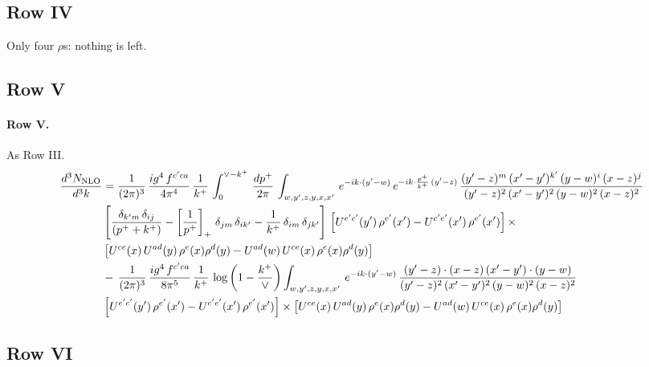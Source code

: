 \documentclass[10pt]{article}
\numberwithin{equation}{section}
\begin{document}
\subsection{Row IV}
Only four $\rho$\textquotesingle s: nothing is left.
\subsection{Row V}
\paragraph{Row V.}
As Row III.
\begin{align}
    \frac{d^{3}N_{\rm NLO}}{d^{3}k} & =  \frac{1}{(2\pi)^{3}}\, \frac{ig^{4}\,f^{c'ca}}{4\pi^{4}}\, \frac{1}{k^{+}}\,\int_{0}^{\vee-k^{+}}\, \frac{dp^{+}}{2\pi}\, \int_{w,y',z,y,x,x'}\, e^{-ik\cdot (y'-w)}\, e^{-ik\cdot \frac{p^{+}}{k^{+}}\,(y'-z)}\,\frac{(y'-z)^{m}\,(x'-y')^{k'}\,(y-w)^{i}\,(x-z)^{j}}{(y'-z)^{2}\,(x'-y')^{2}\,(y-w)^{2}\,(x-z)^{2}}\notag \\ & \left[\frac{\delta_{k'm}\,\delta_{ij}}{(p^{+}+k^{+})}-\left[\frac{1}{p^{+}}\right]_{+}\,\delta_{jm}\,\delta_{ik'}-\frac{1}{k^{+}}\, \delta_{im}\, \delta_{jk'}\right]\, \left[U^{e'c'}(y')\,\rho^{e'}(x')-U^{c'e'}(x')\,\rho^{e'}(x')\right]\times \notag \\ &  \left[U^{ce}(x)\,U^{ad}(y)\,\rho^{e}(x)\rho^{d}(y)-U^{ad}(w)\,U^{ce}(x)\,\rho^{e}(x)\rho^{d}(y)\right] \notag \\
& -\,\frac{1}{(2\pi)^{3}}\, \frac{ig^{4}\,f^{c'ca}}{8\pi^{5}}\, \frac{1}{k^{+}}\,\log{\left(1-\frac{k^{+}}{\vee}\right)} \int_{w,y',z,y,x,x'}\, e^{-ik\cdot (y'-w)}\,\frac{(y'-z)\cdot (x-z)\,(x'-y')\cdot (y-w)}{(y'-z)^{2}\,(x'-y')^{2}\,(y-w)^{2}\,(x-z)^{2}}\notag \\ & \left[U^{e'c'}(y')\,\rho^{e'}(x')-U^{c'e'}(x')\,\rho^{e'}(x')\right]\times  \left[U^{ce}(x)\,U^{ad}(y)\,\rho^{e}(x)\rho^{d}(y)-U^{ad}(w)\,U^{ce}(x)\,\rho^{e}(x)\rho^{d}(y)\right] \label{eq:R:G3V}
\end{align}

\subsection{Row VI}
\end{document}
